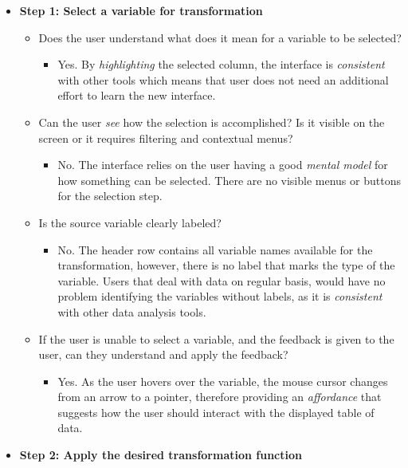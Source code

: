 \documentclass[12pt,letterpaper]{article}
\begin{document}
\begin{itemize}
    \item \textbf{Step 1: Select a variable for transformation}
    \begin{itemize}
        \item Does the user understand what does it mean for a variable to be selected?
        \begin{itemize}
            \item Yes. By \textit{highlighting} the selected column, the interface is \textit{consistent} with other tools which means that user does not need an additional effort to learn the new interface. 
        \end{itemize}
        \item Can the user \textit{see} how the selection is accomplished? Is it visible on the screen or it requires filtering and contextual menus?
        \begin{itemize}
            \item No. The interface relies on the user having a good \textit{mental model} for how something can be selected. There are no visible menus or buttons for the selection step.  
        \end{itemize}
        \item Is the source variable clearly labeled?
            \begin{itemize}
                \item No. The header row contains all variable names available for the transformation, however, there is no label that marks the type of the variable. Users that deal with data on regular basis, would have no problem identifying the variables without labels, as it is \textit{consistent} with other data analysis tools.    
        \end{itemize}
        \item If the user is unable to select a variable, and the feedback is given to the user, can they understand and apply the feedback? 
        \begin{itemize}
                \item Yes. As the user hovers over the variable, the mouse cursor changes from an arrow to a pointer, therefore providing an \textit{affordance} that suggests how the user should interact with the displayed table of data.
        \end{itemize}
    \end{itemize}
    \item \textbf{Step 2: Apply the desired transformation function}

\end{itemize}
\end{document}
